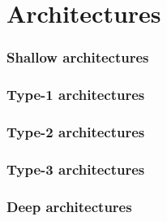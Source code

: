 \section{Architectures}

\begin{frame}
	\frametitle{Shallow architectures}
\end{frame}

\begin{frame}
	\frametitle{Type-1 architectures}
\end{frame}

\begin{frame}
	\frametitle{Type-2 architectures}
\end{frame}

\begin{frame}
	\frametitle{Type-3 architectures}
\end{frame}

\begin{frame}
	\frametitle{Deep architectures}
\end{frame}
